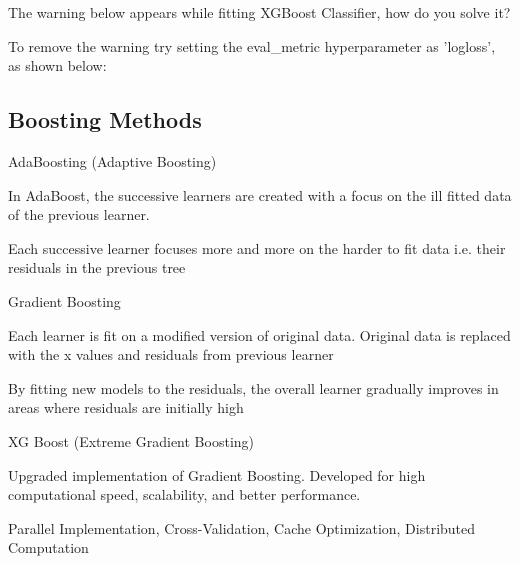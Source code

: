 	\begin{qanda}
		\begin{question}
			The warning below appears while fitting XGBoost Classifier, how do you solve it?  \newline
{}
		\end{question}

		\begin{answer}
To remove the warning try setting the eval\_metric hyperparameter as 'logloss', as shown below:

\noindent {}
		\end{answer}
  \end{qanda}

	\subsection{Boosting Methods}
\noindent AdaBoosting (Adaptive Boosting)
	\begin{bulletedlist}
		\item In AdaBoost, the successive learners are created with a focus on the ill fitted data of the previous learner.
		\item Each successive learner focuses more and more on the harder to fit data i.e. their residuals in the previous tree
	\end{bulletedlist}

\vspace{\baselineskip}
\noindent Gradient Boosting
	\begin{bulletedlist}
		\item Each learner is fit on a modified version of original data. Original data is replaced with the x
values and residuals from previous learner
		\item By fitting new models to the residuals, the overall learner gradually improves in areas
where residuals are initially high
	\end{bulletedlist}

\vspace{\baselineskip}
\noindent XG Boost (Extreme Gradient Boosting)
	\begin{bulletedlist}
		\item Upgraded implementation of Gradient Boosting. Developed for high computational speed, scalability, and better performance.
		\item Parallel Implementation, Cross-Validation, Cache Optimization, Distributed Computation
	\end{bulletedlist}

